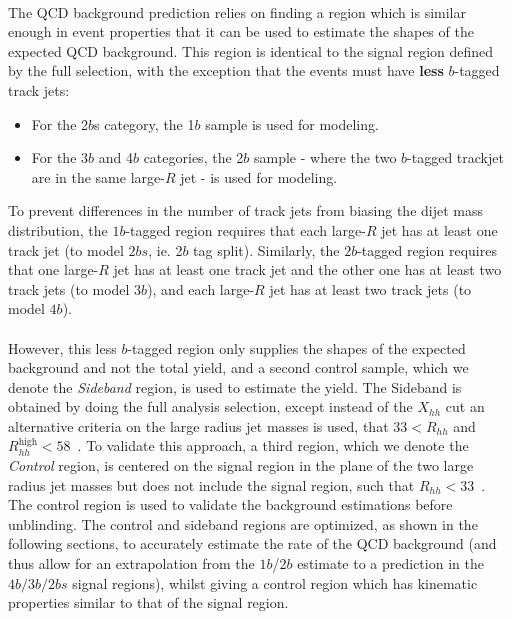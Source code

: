 \paragraph{}
The QCD background prediction relies on finding a region which is similar enough in event properties that it can be used to estimate the shapes of the expected QCD background.  This region is identical to the signal region defined by the full selection, with the exception that the events must have \textbf{less} $b$-tagged track jets:
\begin{itemize}
\item For the 2$b$s category, the 1$b$ sample is used for modeling.
\item For the 3$b$ and 4$b$ categories, the 2$b$ sample - where the two $b$-tagged trackjet are in the same large-$R$ jet - is used for modeling.
\end{itemize}
To prevent differences in the number of track jets from biasing the dijet mass distribution, the $1b$-tagged region requires that each large-$R$ jet has at least one track jet (to model $2bs$, ie. 2$b$ tag split). Similarly, the $2b$-tagged region requires that one large-$R$ jet has at least one track jet and the other one has at least two track jets (to model $3b$), and each large-$R$ jet has at least two track jets (to model $4b$).

\paragraph{}
However, this less $b$-tagged region only supplies the shapes of the expected background and not the total yield, and a second control sample, which we denote the \textit{Sideband} region, is used to estimate the yield. The Sideband is obtained by doing the full analysis selection, except instead of the $X_{hh}$ cut an alternative criteria on the large radius jet masses is used, that $33 < R_{hh} $ and $R_{hh}^{\text{high}} < 58$~\GeV. To validate this approach, a third region, which we denote the \textit{Control} region, is centered on the signal region in the plane of the two large radius jet masses but does not include the signal region, such that $R_{hh} < 33$~\GeV.  The control region is used to validate the background estimations before unblinding. The control and sideband regions are optimized, as shown in the following sections, to accurately estimate the rate of the QCD background (and thus allow for an extrapolation from the $1b$/$2b$ estimate to a prediction in the $4b/3b/2bs$  signal regions), whilst giving a control region which has kinematic properties similar to that of the signal region. 







